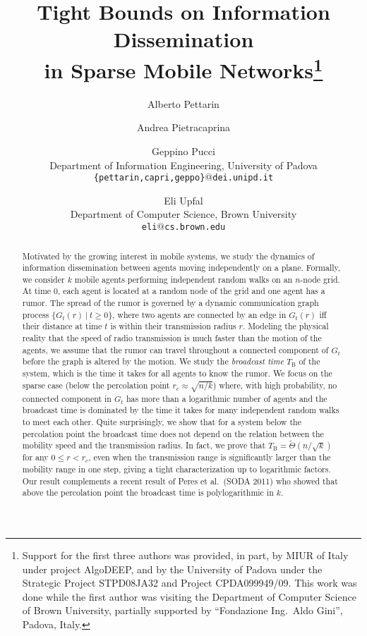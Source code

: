 \documentclass[11pt]{article}
\newcommand{\bigTht}[1]{\tilde{\Theta}\left(#1\right)}
\newcommand{\bt}{T_{\mathrm{B}}}
\newcommand{\tf}[1]{\small{#1}}
\begin{document}
\title{Tight Bounds on Information Dissemination\\ in Sparse Mobile Networks\thanks{Support for the first three authors was provided, in part, by MIUR of Italy
	under project AlgoDEEP, and by the University of
	Padova under the Strategic Project STPD08JA32 and Project
	CPDA099949/09.
	This work was done while the first author was visiting the Department of Computer Science of Brown University,
	partially supported by ``Fondazione Ing.~Aldo Gini'', Padova, Italy.}}

\author{
Alberto Pettarin\and Andrea Pietracaprina\and Geppino Pucci\\
	\tf{Department of Information Engineering,} \tf{University of Padova}\\
	\tf{\texttt{\{pettarin,capri,geppo\}$@$dei.unipd.it}}
\and Eli Upfal\\
	\tf{Department of Computer Science,} \tf{Brown University}\\
	\tf{\texttt{eli$@$cs.brown.edu}}
}

\date{}
\maketitle{}

\begin{abstract}
Motivated by the growing interest in mobile systems,
we study the dynamics of information dissemination
between agents moving independently on a plane.
Formally, we consider $k$ mobile agents
performing independent random walks on an $n$-node grid.
At time $0$, each agent is located
at a random node of the grid and one agent has a rumor.
The spread of the rumor is governed by
a dynamic communication graph process $\{G_t(r)~|~t\geq 0\}$,
where two agents are connected by an edge in $G_t(r)$ iff
their distance at time $t$ is within their transmission radius $r$.
Modeling the physical reality
that the speed of radio transmission
is much faster than the motion of the agents,
we assume that the rumor can travel
throughout a connected component of $G_t$
before the graph is altered by the motion.
We study the \emph{broadcast time} $\bt$ of the system,
which is the time it takes for all agents to know the rumor.
We focus on the sparse case
(below the percolation point $r_c \approx \sqrt{n/k}$)
where, with high probability,
no connected component in $G_t$ has more than
a logarithmic number of agents
and the broadcast time is dominated by the time
it takes for many independent random walks
to meet each other.
Quite surprisingly,
we show that for a system below the percolation point
the broadcast time does not depend on the relation between
the mobility speed and the transmission radius.
In fact, we prove that
$\bt = \bigTht{n / \sqrt{k}}$
for any $0\leq r < r_c$,
even when the transmission range is significantly larger
than the mobility range in one step,
giving a tight characterization up to logarithmic factors.
Our result complements a recent result of
Peres et al.~(SODA 2011)
who showed that above the percolation point
the broadcast time is polylogarithmic in $k$.
\end{abstract}
\end{document}
